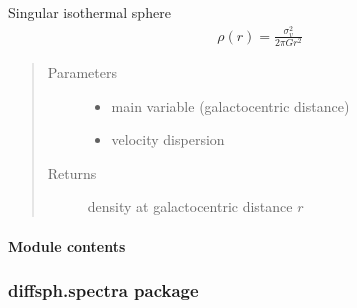 \documentclass[letterpaper,10pt,english]{sphinxmanual}
\begin{document}
\begin{fulllineitems}
\label{\detokenize{diffsph.profiles:diffsph.profiles.templates.sis}}
\sphinxAtStartPar
Singular isothermal sphere
\begin{equation*}
\begin{split}\rho(r) = \frac{\sigma_v^2}{2\pi G r^2}    \end{split}
\end{equation*}\begin{quote}\begin{description}
\item[{Parameters}] \leavevmode\begin{itemize}
\item {} 
\sphinxAtStartPar
{} \textendash{} main variable (galactocentric distance)

\item {} 
\sphinxAtStartPar
{} \textendash{} velocity dispersion

\end{itemize}

\item[{Returns}] \leavevmode
\sphinxAtStartPar
density at galactocentric distance \(r\)

\end{description}\end{quote}

\end{fulllineitems}



\paragraph{Module contents}
\label{\detokenize{diffsph.profiles:module-diffsph.profiles}}\label{\detokenize{diffsph.profiles:module-contents}}

\subsubsection{diffsph.spectra package}
\label{\detokenize{diffsph.spectra:diffsph-spectra-package}}\label{\detokenize{diffsph.spectra::doc}}
\end{document}
